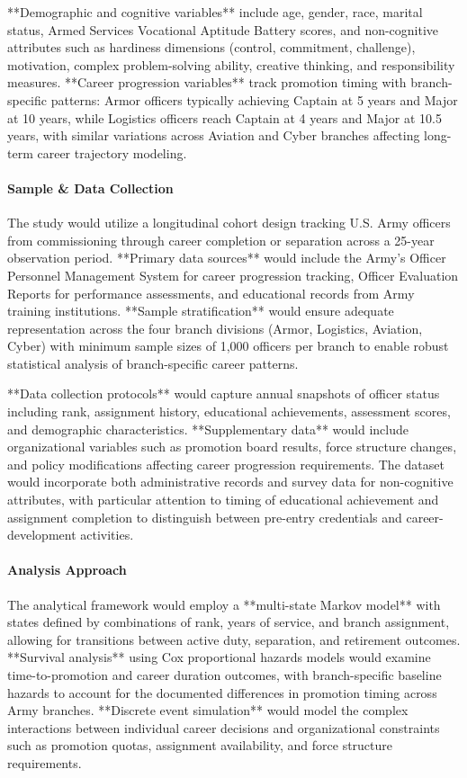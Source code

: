 \documentclass[main.tex]{subfiles}
\begin{document}
**Demographic and cognitive variables** include age, gender, race, marital status, Armed Services Vocational Aptitude Battery scores, and non-cognitive attributes such as hardiness dimensions (control, commitment, challenge), motivation, complex problem-solving ability, creative thinking, and responsibility measures. **Career progression variables** track promotion timing with branch-specific patterns: Armor officers typically achieving Captain at 5 years and Major at 10 years, while Logistics officers reach Captain at 4 years and Major at 10.5 years, with similar variations across Aviation and Cyber branches affecting long-term career trajectory modeling.

\paragraph{Sample \& Data Collection}

The study would utilize a longitudinal cohort design tracking U.S. Army officers from commissioning through career completion or separation across a 25-year observation period. **Primary data sources** would include the Army's Officer Personnel Management System for career progression tracking, Officer Evaluation Reports for performance assessments, and educational records from Army training institutions. **Sample stratification** would ensure adequate representation across the four branch divisions (Armor, Logistics, Aviation, Cyber) with minimum sample sizes of 1,000 officers per branch to enable robust statistical analysis of branch-specific career patterns.

**Data collection protocols** would capture annual snapshots of officer status including rank, assignment history, educational achievements, assessment scores, and demographic characteristics. **Supplementary data** would include organizational variables such as promotion board results, force structure changes, and policy modifications affecting career progression requirements. The dataset would incorporate both administrative records and survey data for non-cognitive attributes, with particular attention to timing of educational achievement and assignment completion to distinguish between pre-entry credentials and career-development activities.

\paragraph{Analysis Approach}

The analytical framework would employ a **multi-state Markov model** with states defined by combinations of rank, years of service, and branch assignment, allowing for transitions between active duty, separation, and retirement outcomes. **Survival analysis** using Cox proportional hazards models would examine time-to-promotion and career duration outcomes, with branch-specific baseline hazards to account for the documented differences in promotion timing across Army branches. **Discrete event simulation** would model the complex interactions between individual career decisions and organizational constraints such as promotion quotas, assignment availability, and force structure requirements.
\end{document}
